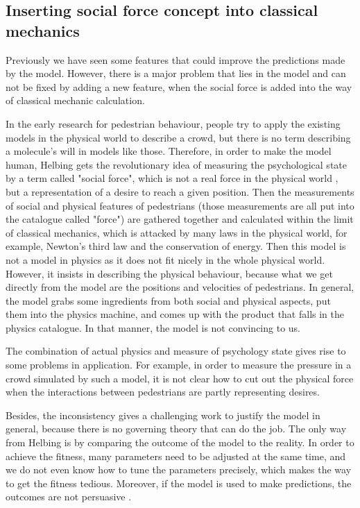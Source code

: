 \subsection{Inserting social force concept into classical mechanics}
\label{subsec:development}

Previously we have seen some features that could improve the 
predictions made by the model. However, there is a major problem that lies 
in the model and can not be fixed by adding a new feature, when the social 
force is added into the way of classical mechanic calculation.

In the early research for pedestrian behaviour, people try to apply the existing 
models in the physical world to describe a crowd, but there is no term describing 
a molecule's will in models like those. Therefore, in order to make the model 
human, Helbing gets the revolutionary idea of measuring the psychological state 
by a term called "social force", which is not a real force in the physical world 
\cite{social-force}, but a representation of a desire to reach a given position. 
Then the measurements of social and physical features of pedestrians (those 
measurements are all put into the catalogue called "force") are gathered together 
and calculated within the limit of classical mechanics, which is attacked by many 
laws in the physical world, for example, Newton's third law and the conservation of 
energy. Then this model is not a model in physics as it does not fit nicely in the 
whole physical world. However, it insists in describing the physical behaviour, 
because what we get directly from the model are the positions and velocities of 
pedestrians. In general, the model grabs some ingredients from both social and 
physical aspects, put them into the physics machine, and comes up with the 
product that falls in the physics catalogue. In that manner, the model is not 
convincing to us.

The combination of actual physics and measure of psychology state gives 
rise to some problems in application. For example, in order to measure the pressure 
in a crowd simulated by such a model, it is not clear how to cut out the physical force 
when the interactions between pedestrians are partly representing desires. 

Besides, the inconsistency gives a challenging work to justify the model in general, 
because there is no governing theory that can do the job. The only way from Helbing 
is by comparing the outcome of the model to the reality. In order to achieve 
the fitness, many parameters need to be adjusted at the same time, and we do 
not even know how to tune the parameters precisely, which makes the way to 
get the fitness tedious. Moreover, if the model is used to make predictions, the
outcomes are not persuasive . 

